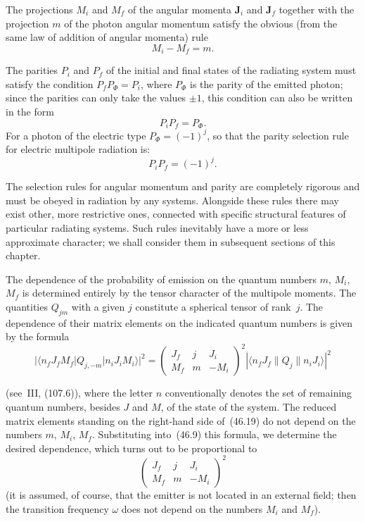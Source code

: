 The projections $M_i$ and $M_f$ of the angular momenta $\mathbf{J}_i$ and $\mathbf{J}_f$ together with the projection $m$ of the photon angular momentum satisfy the obvious (from the same law of addition of angular momenta) rule
\begin{equation}
M_i - M_f = m.
\tag{46.16}
\end{equation}

The parities $P_i$ and $P_f$ of the initial and final states of the radiating system must satisfy the condition $P_f P_\Phi = P_i$, where $P_\Phi$ is the parity of the emitted photon; since the parities can only take the values $\pm 1$, this condition can also be written in the form
\begin{equation}
P_i P_f = P_\Phi.
\tag{46.17}
\end{equation}
For a photon of the electric type $P_\Phi = (-1)^j$, so that the parity selection rule for electric multipole radiation is:
\begin{equation}
P_i P_f = (-1)^j.
\tag{46.18}
\end{equation}

The selection rules for angular momentum and parity are completely rigorous and must be obeyed in radiation by any systems. Alongside these rules there may exist other, more restrictive ones, connected with specific structural features of particular radiating systems. Such rules inevitably have a more or less approximate character; we shall consider them in subsequent sections of this chapter.

The dependence of the probability of emission on the quantum numbers $m$, $M_i$, $M_f$ is determined entirely by the tensor character of the multipole moments. The quantities $Q_{jm}$ with a given $j$ constitute a spherical tensor of rank~$j$. The dependence of their matrix elements on the indicated quantum numbers is given by the formula
\begin{equation}
|\langle n_f J_f M_f|Q_{j,-m}|n_i J_i M_i\rangle|^2 = \begin{pmatrix} J_f & j & J_i \\ M_f & m & -M_i \end{pmatrix}^{\!2}|\langle n_f J_f\|Q_j\|n_i J_i\rangle|^2
\tag{46.19}
\end{equation}

(see~III, (107.6)), where the letter $n$ conventionally denotes the set of remaining quantum numbers, besides $J$ and $M$, of the state of the system. The reduced matrix elements standing on the right-hand side of~(46.19) do not depend on the numbers $m$, $M_i$, $M_f$. Substituting into~(46.9) this formula, we determine the desired dependence, which turns out to be proportional to
\[
\begin{pmatrix} J_f & j & J_i \\ M_f & m & -M_i \end{pmatrix}^{\!2}
\]
(it is assumed, of course, that the emitter is not located in an external field; then the transition frequency $\omega$ does not depend on the numbers $M_i$ and $M_f$).

